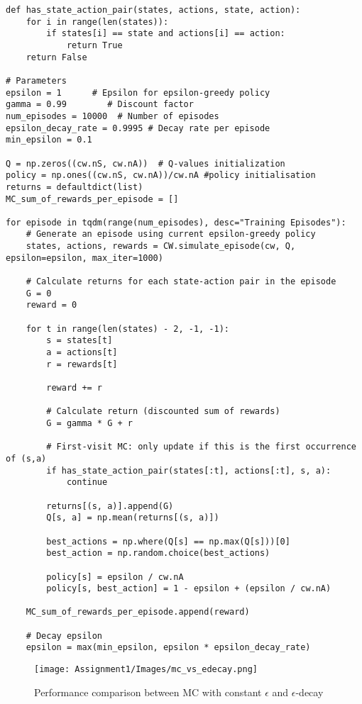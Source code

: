 \documentclass[11pt,a4paper]{article}
\begin{document}
\begin{lstlisting}
def has_state_action_pair(states, actions, state, action):
    for i in range(len(states)):
        if states[i] == state and actions[i] == action:
            return True
    return False

# Parameters
epsilon = 1      # Epsilon for epsilon-greedy policy
gamma = 0.99        # Discount factor
num_episodes = 10000  # Number of episodes
epsilon_decay_rate = 0.9995 # Decay rate per episode
min_epsilon = 0.1

Q = np.zeros((cw.nS, cw.nA))  # Q-values initialization
policy = np.ones((cw.nS, cw.nA))/cw.nA #policy initialisation
returns = defaultdict(list)
MC_sum_of_rewards_per_episode = []

for episode in tqdm(range(num_episodes), desc="Training Episodes"):
    # Generate an episode using current epsilon-greedy policy
    states, actions, rewards = CW.simulate_episode(cw, Q, epsilon=epsilon, max_iter=1000)
    
    # Calculate returns for each state-action pair in the episode
    G = 0
    reward = 0
    
    for t in range(len(states) - 2, -1, -1):
        s = states[t]
        a = actions[t]
        r = rewards[t]

        reward += r
        
        # Calculate return (discounted sum of rewards)
        G = gamma * G + r
        
        # First-visit MC: only update if this is the first occurrence of (s,a)
        if has_state_action_pair(states[:t], actions[:t], s, a):
            continue

        returns[(s, a)].append(G)
        Q[s, a] = np.mean(returns[(s, a)])

        best_actions = np.where(Q[s] == np.max(Q[s]))[0]
        best_action = np.random.choice(best_actions)
             
        policy[s] = epsilon / cw.nA
        policy[s, best_action] = 1 - epsilon + (epsilon / cw.nA)

    MC_sum_of_rewards_per_episode.append(reward)

    # Decay epsilon
    epsilon = max(min_epsilon, epsilon * epsilon_decay_rate)
\end{lstlisting}

\begin{figure}[h!]
    \centering
    \texttt{[image: Assignment1/Images/mc\_vs\_edecay.png]}
    \caption{Performance comparison between MC with constant $\epsilon$ and $\epsilon$-decay}
    \label{fig:yourlabel}
\end{figure}
\end{document}
